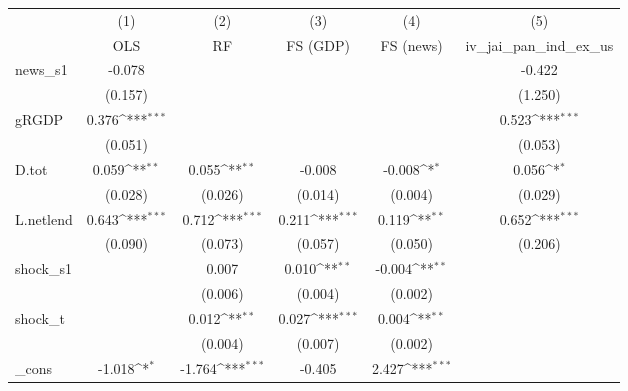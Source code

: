 {
\def\sym#1{\ifmmode^{#1}\else\(^{#1}\)\fi}
\begin{tabular}{l*{5}{c}}
\toprule
            &\multicolumn{1}{c}{(1)}&\multicolumn{1}{c}{(2)}&\multicolumn{1}{c}{(3)}&\multicolumn{1}{c}{(4)}&\multicolumn{1}{c}{(5)}\\
            &\multicolumn{1}{c}{OLS}&\multicolumn{1}{c}{RF}&\multicolumn{1}{c}{FS (GDP)}&\multicolumn{1}{c}{FS (news)}&\multicolumn{1}{c}{iv\_jai\_pan\_ind\_ex\_us}\\
\midrule
news\_s1     &      -0.078         &                     &                     &                     &      -0.422         \\
            &     (0.157)         &                     &                     &                     &     (1.250)         \\
\addlinespace
gRGDP       &       0.376\sym{***}&                     &                     &                     &       0.523\sym{***}\\
            &     (0.051)         &                     &                     &                     &     (0.053)         \\
\addlinespace
D.tot       &       0.059\sym{**} &       0.055\sym{**} &      -0.008         &      -0.008\sym{*}  &       0.056\sym{*}  \\
            &     (0.028)         &     (0.026)         &     (0.014)         &     (0.004)         &     (0.029)         \\
\addlinespace
L.netlend   &       0.643\sym{***}&       0.712\sym{***}&       0.211\sym{***}&       0.119\sym{**} &       0.652\sym{***}\\
            &     (0.090)         &     (0.073)         &     (0.057)         &     (0.050)         &     (0.206)         \\
\addlinespace
shock\_s1    &                     &       0.007         &       0.010\sym{**} &      -0.004\sym{**} &                     \\
            &                     &     (0.006)         &     (0.004)         &     (0.002)         &                     \\
\addlinespace
shock\_t     &                     &       0.012\sym{**} &       0.027\sym{***}&       0.004\sym{**} &                     \\
            &                     &     (0.004)         &     (0.007)         &     (0.002)         &                     \\
\addlinespace
\_cons      &      -1.018\sym{*}  &      -1.764\sym{***}&      -0.405         &       2.427\sym{***}&                     \\

\end{tabular}}
